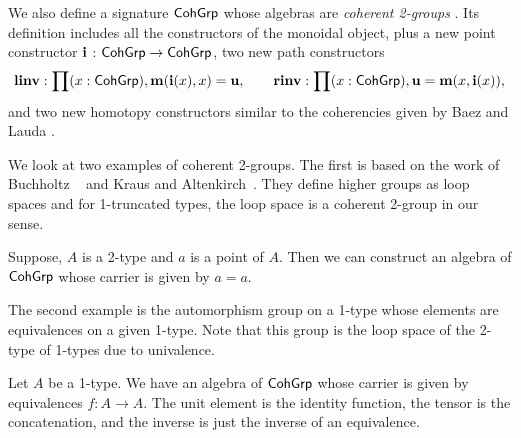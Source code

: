 
We also define a signature $\mathsf{CohGrp}$ whose algebras are \emph{coherent 2-groups} \cite{baez2004groups}.
Its definition includes all the constructors of the monoidal object, plus a new point constructor
$\operatorname{\mathbf{i}}$ : $\mathsf{CohGrp} \rightarrow \mathsf{CohGrp}$, two new path
constructors
\[
\operatorname{\mathbf{linv}} : \prod (x : \mathsf{CohGrp}) , \operatorname{\mathbf{m}}(\operatorname{\mathbf{i}}(x),x) = \operatorname{\mathbf{u}},
\quad\quad
\operatorname{\mathbf{rinv}} : \prod (x : \mathsf{CohGrp}) , \operatorname{\mathbf{u}} = \operatorname{\mathbf{m}}(x,\operatorname{\mathbf{i}}(x)),
\]
and two new homotopy constructors similar to the coherencies given by Baez and Lauda \cite{baez2004groups}.

We look at two examples of coherent 2-groups.
The first is based on the work of Buchholtz \etal \ \cite{DBLP:conf/lics/BuchholtzDR18} and Kraus and Altenkirch~\cite{KA18}.
They define higher groups as loop spaces and for 1-truncated types, the loop space is a coherent 2-group in our sense.

\begin{example}
Suppose, $A$ is a 2-type and $a$ is a point of $A$.
Then we can construct an algebra of $\mathsf{CohGrp}$ whose carrier is given by $a = a$.
\end{example}

The second example is the automorphism group on a 1-type whose elements are equivalences on a given 1-type.
Note that this group is the loop space of the 2-type of 1-types due to univalence.

\begin{example}
Let $A$ be a 1-type.
We have an algebra of $\mathsf{CohGrp}$ whose carrier is given by equivalences $f : A \to A$.
The unit element is the identity function, the tensor is the concatenation, and the inverse is just the inverse of an equivalence.
\end{example}

